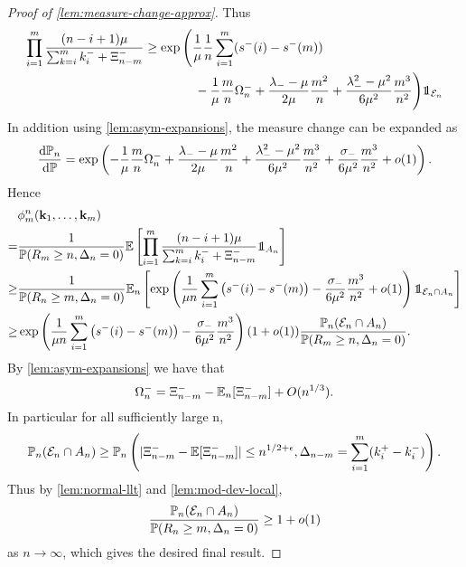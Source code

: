 \begin{proof}[Proof of \cref{lem:measure-change-approx}]
    Thus
    \begin{align*}
        \prod_{i=1}^m \frac{(n-i+1)\mu}{\sum_{k=i}^m k^-_i + \Xi^-_{n-m}}
        &\geq \exp \Bigg( \frac{1}{\mu} \frac{1}{n} \sum_{i=1}^m (s^-(i) - s^-(m)) \nonumber \\
        &\hspace{4em} - \frac{1}{\mu} \frac{m}{n} \Omega^-_n + \frac{\lambda_- - \mu}{2 \mu} \frac{m^2}{n} + \frac{\lambda_-^2 - \mu^2}{6 \mu^2} \frac{m^3}{n^2} \Bigg) \one_{\omegaevent_n}
    \end{align*}
    In addition using \cref{lem:asym-expansions}, the measure change can be expanded as
    \begin{equation*}
        \frac{\mathrm{d}{\mathbb P}_n}{\mathrm{d}{\mathbb P}} = \exp \left( 
            - \frac{1}{\mu} \frac{m}{n} \Omega_n^- + \frac{\lambda_- - \mu}{2\mu} \frac{m^2}{n}
            + \frac{\lambda_-^2 - \mu^2}{6 \mu^2} \frac{m^3}{n^2} + \frac{\sigma_-}{6 \mu^2} \frac{m^3}{n^2} + o(1)
         \right).
    \end{equation*}
    Hence
    \begin{align*}
        &\phi^n_m(\vk_1, \ldots, \vk_m) \\
        =& \frac{1}{\P(R_m \geq n, \Delta_n = 0)} \E \left[\prod_{i=1}^m \frac{(n-i+1)\mu}{\sum_{k=i}^m k^-_i + \Xi^-_{n-m}} \one_{A_n} \right] \\
        \geq& \frac{1}{\P(R_n \geq m, \Delta_n = 0)} \E_n \left[ \exp \left(
                \frac{1}{\mu n} \sum_{i=1}^m \left( s^-(i) - s^-(m) \right)
                - \frac{\sigma_-}{6 \mu^2} \frac{m^3}{n^2} + \littleo(1)
            \right) \one_{\omegaevent_n \cap A_n} \right] \\
        \geq& \exp \left(
                \frac{1}{\mu n} \sum_{i=1}^m \left( s^-(i) - s^-(m) \right)
                - \frac{\sigma_-}{6 \mu^2} \frac{m^3}{n^2}
            \right) (1 + \littleo(1)) \frac{\P_n(\omegaevent_n \cap A_n)}{\P(R_m \geq n, \Delta_n = 0)}.
    \end{align*}
    By \cref{lem:asym-expansions} we have that
    \begin{equation*}
        \Omega^-_n = \Xi^-_{n-m} - {\mathbb E}_n[\Xi^-_{n-m}] + O(n^{1/3}).
    \end{equation*}
    In particular for all sufficiently large n,
    \begin{equation*}
        {\mathbb P}_n(\mathcal E_n \cap A_n) \geq
        {\mathbb P}_n\left(
            \lvert\Xi^-_{n-m} - {\mathbb E}[\Xi^-_{n-m}]\rvert \leq n^{1/2 + \epsilon}, \Delta_{n-m} = \sum_{i=1}^m (k^+_i - k^-_i)
        \right).
    \end{equation*}
    Thus by \cref{lem:normal-llt} and \cref{lem:mod-dev-local},
    \begin{equation*}
        \frac{{\mathbb P}_n(\mathcal E_n \cap A_n)}{{\mathbb P}(R_n \geq m, \Delta_n = 0)} \geq 1 + o(1)
    \end{equation*}
    as $n \to \infty$, which gives the desired final result.
\end{proof}

